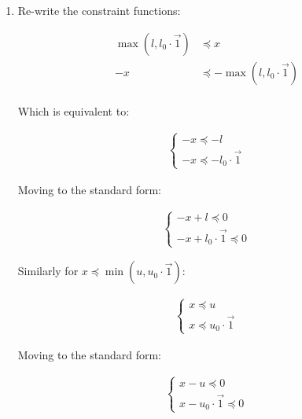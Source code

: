 \documentclass[11pt, letterpaper, titlepage]{article}
\begin{document}
\begin{enumerate}
    
    \item %
    
    Re-write the constraint functions:
    
    \begin{equation*}
        \begin{aligned}
            \max (l, l_0 \cdot \Vec{1}) &\preceq x \\
            - x &\preceq - \max (l, l_0 \cdot \Vec{1}) \\
        \end{aligned}
    \end{equation*}
    
    Which is equivalent to:
    
    \begin{gather*}
        \begin{cases}
            -x \preceq - l \\
            -x \preceq - l_0 \cdot \Vec{1}
        \end{cases}
    \end{gather*}
    
    Moving to the standard form:
    
    \begin{gather*}
        \begin{cases}
            -x + l \preceq 0 \\
            -x + l_0 \cdot \Vec{1} \preceq 0
        \end{cases}
    \end{gather*}
    
    Similarly for $x \preceq \min (u, u_0 \cdot \Vec{1})$:
    
    \begin{gather*}
        \begin{cases}
            x \preceq u \\
            x \preceq u_0 \cdot \Vec{1}
        \end{cases}
    \end{gather*}
    
    Moving to the standard form:
    
    \begin{gather*}
        \begin{cases}
            x - u \preceq 0 \\
            x - u_0 \cdot \Vec{1} \preceq 0
        \end{cases}
    \end{gather*}
    

\end{enumerate}
\end{document}
